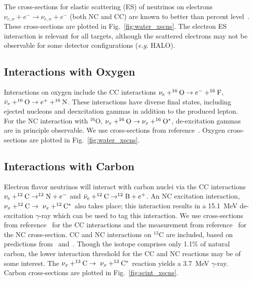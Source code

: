 \documentclass[12pt]{article}
\begin{document}
The cross-sections for elastic scattering (ES) of
neutrinos on electrons $\nu_{e,x} + e^- \rightarrow \nu_{e,x} + e^-$
 (both NC and CC) are known to better than percent level~\cite{Marciano:2003eq}.
These cross-sections are plotted in Fig.~\ref{fig:water_xscns}.
The electron ES interaction is relevant for all targets, although the scattered
electrons may not be observable for some detector configurations
(\textit{e.g.} HALO).


\subsection{Interactions with Oxygen}

Interactions on oxygen include the CC interactions $\nu_e+^{16}{\rm
  O}\rightarrow e^-+^{16}{\rm F}$, $\bar{\nu}_e+^{16}{\rm O}
\rightarrow e^++^{16}{\rm N}$.
These interactions have diverse final states, including
ejected nucleons and deexcitation gammas in addition to the produced
lepton.  For the NC interaction with $^{16}$O, $\nu_x+^{16}{\rm O}
\rightarrow \nu_x+ ^{16}{\rm O}^*$, de-excitation gammas are in principle
observable.  We use cross-sections from reference~\cite{Kolbe:2002gk}.
Oxygen cross-sections are plotted in Fig.~\ref{fig:water_xscns}.

\subsection{Interactions with Carbon}

Electron flavor neutrinos will interact with carbon nuclei via the CC
interactions $\nu_e+^{12}{\rm C}\rightarrow^{12}{\rm N}+e^-$ and
$\bar{\nu}_e +^{12}{\rm C}\rightarrow ^{12}{\rm B}+e^+$. An NC
excitation interaction, $\nu_x+^{12}{\rm C}\rightarrow~\nu_x+^{12}{\rm
  C}^{*}$ also takes place; this interaction results in a 15.1~MeV
de-excitation $\gamma$-ray which can be used to tag this interaction.
We use cross-sections from reference~\cite{Kolbe:1999au} for the CC interactions and the measurement from reference~\cite{Armbruster:1998gk} for the NC cross-section.
CC and NC interactions on $^{13}\mathrm{C}$ are included, based on predictions
from~\cite{Pourkaviani:1991pb} and~\cite{Suzuki:2012aa}.  Though the isotope 
comprises only 1.1\% of natural carbon, the lower interaction threshold for
the CC and NC reactions may be of some interest.  The $\nu_x+^{13}{\rm C}\rightarrow~\nu_x+^{13}{\rm
  C}^{*}$ reaction yields a 3.7~MeV $\gamma$-ray.
Carbon cross-sections are plotted in Fig.~\ref{fig:scint_xscns}.
\end{document}
